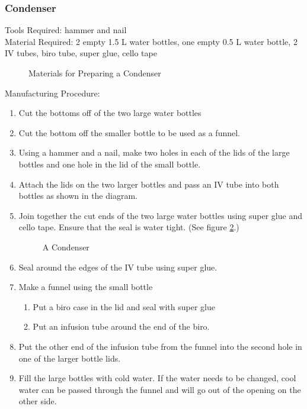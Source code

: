 \subsubsection*{Condenser}
Tools Required: hammer and nail\\
Material Required: 2 empty 1.5 L water bottles, one empty 0.5 L water bottle, 2 IV tubes, biro tube, super glue, cello tape\\

\begin{figure}[h!]
\begin{center}
\def\svgwidth{250pt}

\caption{Materials for Preparing a Condenser}
\label{fig:condenser-materials}
\end{center}
\end{figure}

Manufacturing Procedure:
\begin{enumerate}
\item{Cut the bottoms off of the two large water bottles}
\item{Cut the bottom off the smaller bottle to be used as a funnel.}
\item{Using a hammer and a nail, make two holes in each of the lids of the large bottles and one hole in the lid of the small bottle.}
\item{Attach the lids on the two larger bottles and pass an IV tube into both bottles as shown in the diagram.}
\item {Join together the cut ends of the two large water bottles using super glue and cello tape. Ensure that the seal is water tight. (See figure \ref{fig:condenser}.)}


\begin{figure}[h!]
\begin{center}
\def\svgwidth{350pt}

\caption{A Condenser}
\label{fig:condenser}
\end{center}
\end{figure}


\item {Seal around the edges of the IV tube using super glue.}
\item {Make a funnel using the small bottle}
\begin{enumerate}
 \item {Put a biro case in the lid and seal with super glue}
 \item{Put an infusion tube around the end of the biro.}
\end{enumerate}
\item{Put the other end of the infusion tube from the funnel into the second hole in one of the larger bottle lids.}
\item{Fill the large bottles with cold water. If the water needs to be changed, cool water can be passed through the funnel and will go out of the opening on the other side.}
\end{enumerate}





